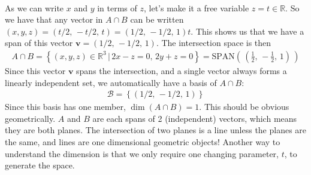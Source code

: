 {\begin{align*}
\end{align*}
As we can write $x$ and $y$ in terms of $z$, let's make it a free variable $z=t\in\mathbb{R}$. So we have that any vector in $A\cap B$ can be written $(x,y,z)=(t/2,\,-t/2,\,t)=(1/2,\,-1/2,\,1)t$. This shows us that we have a span of this vector $\mathbf{v}=\left( 1/2,\,-1/2,\,1 \right)$. The intersection space is then
\begin{align*}
A \cap B = \left\{ \left( x,y,z \right) \in \mathbb{R}^3 \, | \, 2x-z = 0, \, 2y + z =0 \right\} = \text{SPAN}\left( \, \left( \frac{1}{2},\,-\frac{1}{2},\,1 \right) \, \right)
\end{align*}
Since this vector $\mathbf{v}$ spans the intersection, and a single vector always forms a linearly independent set, we automatically have a basis of $A \cap B$:
\begin{align*}
\mathcal{B} = \left\{ \left( 1/2,\,-1/2,\,1 \right)\right\}
\end{align*}
Since this basis has one member, $\dim(A \cap B)=1$. This should be obvious geometrically. $A$ and $B$ are each spans of 2 (independent) vectors, which means they are both planes. The intersection of two planes is a line unless the planes are the same, and lines are one dimensional geometric objects! Another way to understand the dimension is that we only require one changing parameter, $t$, to generate the space.
}





